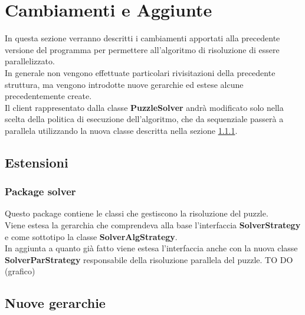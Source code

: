 % 
%
%

\section{Cambiamenti e Aggiunte}
In questa sezione verranno descritti i cambiamenti apportati alla precedente versione del programma per permettere all'algoritmo di risoluzione di essere parallelizzato. \\
In generale non vengono effettuate particolari rivisitazioni della precedente struttura, ma vengono introdotte nuove gerarchie ed estese alcune precedentemente create. \\
Il client rappresentato dalla classe \textbf{PuzzleSolver} andrà modificato solo nella scelta della politica di esecuzione dell'algoritmo, che da sequenziale passerà a parallela utilizzando la nuova classe descritta nella sezione \ref{ssub:package_solver_1}.

	\subsection{Estensioni} %
	\label{sub:estensioni}
		\subsubsection{Package solver} %
		\label{ssub:package_solver_1}
		Questo package contiene le classi che gestiscono la risoluzione del puzzle. \\
		Viene estesa la gerarchia che comprendeva alla base l'interfaccia \textbf{SolverStrategy} e come sottotipo la classe \textbf{SolverAlgStrategy}. \\
		In aggiunta a quanto già fatto viene estesa l'interfaccia anche con la nuova classe \textbf{SolverParStrategy} responsabile della risoluzione parallela del puzzle.
		TO DO (grafico)
	
	\subsection{Nuove gerarchie} %
	\label{sub:nuove_gerarchie}
